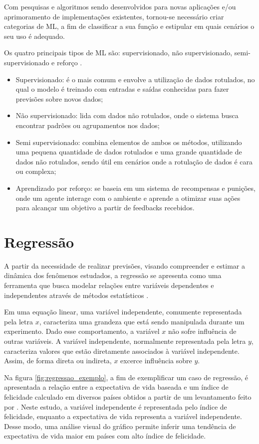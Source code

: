 Com pesquisas e algoritmos sendo desenvolvidos para novas aplicações e/ou aprimoramento de implementações existentes, tornou-se necessário criar categorias de ML, a fim de classificar a sua função e estipular em quais cenários o seu uso é adequado.

Os quatro principais tipos de ML são: supervisionado, não supervisionado, semi-supervisionado e reforço \cite{saravanan2018}. 

\begin{itemize}
    \item Supervisionado: é o mais comum e envolve a utilização de dados rotulados, no qual o modelo é treinado com entradas e saídas conhecidas para fazer previsões sobre novos dados;
    \item Não supervisionado: lida com dados não rotulados, onde o sistema busca encontrar padrões ou agrupamentos nos dados;
    \item Semi supervisionado: combina elementos de ambos os métodos, utilizando uma pequena quantidade de dados rotulados e uma grande quantidade de dados não rotulados, sendo útil em cenários onde a rotulação de dados é cara ou complexa;
    \item Aprendizado por reforço: se baseia em um sistema de recompensas e punições, onde um agente interage com o ambiente e aprende a otimizar suas ações para alcançar um objetivo a partir de feedbacks recebidos.
\end{itemize}

\section{Regressão}

A partir da necessidade de realizar previsões, visando compreender e estimar a dinâmica dos fenômenos estudados, a regressão se apresenta como uma ferramenta que busca modelar relações entre variáveis dependentes e independentes através de métodos estatísticos \cite{soto2013}.

Em uma equação linear, uma variável independente, comumente representada pela letra $x$, caracteriza uma grandeza que está sendo manipulada durante um experimento. Dado esse comportamento, a variável $x$ não sofre influência de outras variáveis. A variável independente, normalmente representada pela letra $y$, caracteriza valores que estão diretamente associados à variável independente. Assim, de forma direta ou indireta, $x$ excerce influência sobre $y$.

Na figura \ref{fig:regressao_exemplo}, a fim de exemplificar um caso de regressão, é apresentada a relação entre a expectativa de vida baseada e um índice de felicidade calculado em diversos países obtidos a partir de um levantamento feito por \cite{helliwell2020}. Neste estudo, a variável independente é representada pelo índice de felicidade, enquanto a expectativa de vida representa a variável independente. Desse modo, uma análise visual do gráfico permite inferir uma tendência de expectativa de vida maior em países com alto índice de felicidade. 

